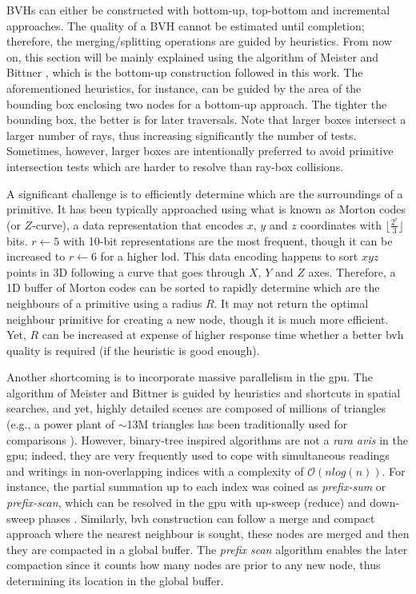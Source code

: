 BVHs can either be constructed with bottom-up, top-bottom and incremental approaches. The quality of a BVH cannot be estimated until completion; therefore, the merging/splitting operations are guided by heuristics. From now on, this section will be mainly explained using the algorithm of Meister and Bittner \cite{meister_parallel_2018}, which is the bottom-up construction followed in this work. The aforementioned heuristics, for instance, can be guided by the area of the bounding box enclosing two nodes for a bottom-up approach. The tighter the bounding box, the better is for later traversals. Note that larger boxes intersect a larger number of rays, thus increasing significantly the number of tests. Sometimes, however, larger boxes are intentionally preferred to avoid primitive intersection tests which are harder to resolve than ray-box collisions.

A significant challenge is to efficiently determine which are the surroundings of a primitive. It has been typically approached using what is known as Morton codes (or $Z$-curve), a data representation that encodes $x$, $y$ and $z$ coordinates with $\lfloor{\frac{2^r}{3}\rfloor}$ bits. $r \gets 5$ with 10-bit representations are the most frequent, though it can be increased to $r \gets 6$ for a higher \acrshort{lod}. This data encoding happens to sort $xyz$ points in 3D following a curve that goes through $X$, $Y$ and $Z$ axes. Therefore, a 1D buffer of Morton codes can be sorted to rapidly determine which are the neighbours of a primitive using a radius $R$. It may not return the optimal neighbour primitive for creating a new node, though it is much more efficient. Yet, $R$ can be increased at expense of higher response time whether a better \acrshort{bvh} quality is required (if the heuristic is good enough). 

Another shortcoming is to incorporate massive parallelism in the \acrshort{gpu}. The algorithm of Meister and Bittner \cite{meister_parallel_2018} is guided by heuristics and shortcuts in spatial searches, and yet, highly detailed scenes are composed of millions of triangles (e.g., a power plant of $\sim$13M triangles has been traditionally used for comparisons \cite{mcguire_computer_2017}). However, binary-tree inspired algorithms are not a \textit{rara avis} in the \acrshort{gpu}; indeed, they are very frequently used to cope with simultaneous readings and writings in non-overlapping indices with a complexity of $\mathcal{O}(n\textit{log}(n))$. For instance, the partial summation up to each index was coined as \textit{prefix-sum} or \textit{prefix-scan}, which can be resolved in the \acrshort{gpu} with up-sweep (reduce) and down-sweep phases \cite{nguyen_gpu_2007}. Similarly, \acrshort{bvh} construction can follow a merge and compact approach where the nearest neighbour is sought, these nodes are merged and then they are compacted in a global buffer. The \textit{prefix scan} algorithm enables the later compaction since it counts how many nodes are prior to any new node, thus determining its location in the global buffer.

